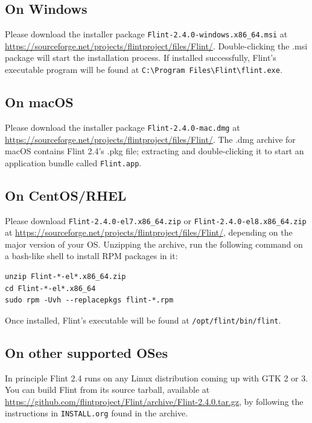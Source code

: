 \documentclass[a4paper,10pt]{report}
\begin{document}
\subsection{On Windows}
\label{sec:orgd573968}
Please download the installer package \texttt{Flint-2.4.0-windows.x86\_64.msi} at
\url{https://sourceforge.net/projects/flintproject/files/Flint/}.
Double-clicking the .msi package will start the installation process.
If installed successfully, Flint's executable program will be found at
\texttt{C:\textbackslash{}Program Files\textbackslash{}Flint\textbackslash{}flint.exe}.

\subsection{On macOS}
\label{sec:org234d3a7}
Please download the installer package \texttt{Flint-2.4.0-mac.dmg} at
\url{https://sourceforge.net/projects/flintproject/files/Flint/}.
The .dmg archive for macOS contains Flint 2.4's .pkg file; extracting and
double-clicking it to start an application bundle called
\texttt{Flint.app}.

\subsection{On CentOS/RHEL}
\label{sec:orgcca8e8a}
Please download \texttt{Flint-2.4.0-el7.x86\_64.zip} or \texttt{Flint-2.4.0-el8.x86\_64.zip}
at \url{https://sourceforge.net/projects/flintproject/files/Flint/}, depending
on the major version of your OS.
Unzipping the archive, run the following command on a bash-like shell to install
RPM packages in it:
\begin{verbatim}
unzip Flint-*-el*.x86_64.zip
cd Flint-*-el*.x86_64
sudo rpm -Uvh --replacepkgs flint-*.rpm
\end{verbatim}
Once installed, Flint's executable will be found at
\texttt{/opt/flint/bin/flint}.

\subsection{On other supported OSes}
\label{sec:org4ebc770}
In principle Flint 2.4 runs on any Linux distribution coming up with GTK 2 or 3.
You can build Flint from its source tarball, available at
\url{https://github.com/flintproject/Flint/archive/Flint-2.4.0.tar.gz},
by following the instructions in \texttt{INSTALL.org} found in the archive.
\end{document}
